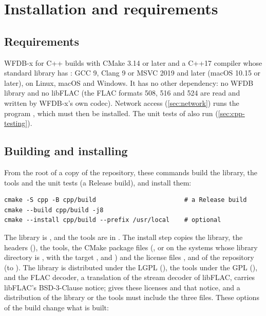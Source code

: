 \section{Installation and requirements}
\label{sec:cpp-install}

\subsection{Requirements}

WFDB-x for C++ builds with CMake 3.14 or later and a C++17 compiler whose standard
library has : GCC 9, Clang 9 or MSVC 2019 and later (macOS 10.15 or
later), on Linux, macOS and Windows. It has no other dependency: no WFDB library and no
libFLAC (the FLAC formats 508, 516 and 524 are read and written by WFDB-x's own codec).
Network access (\cref{sec:network}) runs the program , which must then be
installed. The unit tests of  also run 
(\cref{sec:cpp-testing}).

\subsection{Building and installing}

From the root of a copy of the repository, these commands build the library, the tools
and the unit tests (a Release build), and install them:

\begin{lstlisting}[style=shell]
cmake -S cpp -B cpp/build                        # a Release build
cmake --build cpp/build -j8
cmake --install cpp/build --prefix /usr/local    # optional
\end{lstlisting}

The library is , and the tools are in .
The install step copies the library, the headers (), the tools, the
CMake package files (, or
 on the systems whose library directory is ,
with the target , and ) and the license files
,  and  of the repository (to
). The library is distributed under the LGPL (), the
tools under the GPL (), and the FLAC decoder, a translation of the
stream decoder of libFLAC, carries libFLAC's BSD-3-Clause notice;  gives
these licenses and that notice, and a distribution of the library or the tools must
include the three files. These options of the build change what is built:

